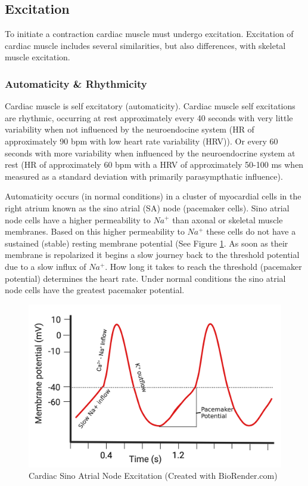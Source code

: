 \subsection{Excitation}

To initiate a contraction cardiac muscle must undergo excitation. Excitation of cardiac muscle includes several similarities, but also differences, with skeletal muscle excitation. 

\subsubsection{Automaticity \& Rhythmicity}

Cardiac muscle is self excitatory (automaticity). Cardiac muscle self excitations are rhythmic, occurring at rest approximately every 40 seconds with very little variability when not influenced by the neuroendocine system (HR of approximately 90 bpm with low heart rate variability (HRV)). Or every 60 seconds with more variability when influenced by the neuroendocrine system at rest (HR of approximately 60 bpm with a HRV of approximately 50-100 ms when measured as a standard deviation with primarily parasympthatic influence).

Automaticity occurs (in normal conditions) in a cluster of myocardial cells in the right atrium known as the sino atrial (SA) node (pacemaker cells). Sino atrial node cells have a higher permeability to $Na^+$ than axonal or skeletal muscle membranes. Based on this higher permeability to $Na^+$ these cells do not have a sustained (stable) resting membrane potential (See Figure \ref{fig:Cardiac_SA_Node_AP}. As soon as their membrane is repolarized it begins a slow journey back to the threshold potential due to a slow influx of $Na^+$. How long it takes to reach the threshold (pacemaker potential) determines the heart rate. Under normal conditions the sino atrial node cells have the greatest pacemaker potential.

\begin{figure}[!h]
    \centering
    \includegraphics[width=1\linewidth]{./figure/Cardiac_SA_Node_AP.png}
    \caption{Cardiac Sino Atrial Node Excitation \footnotesize{(Created with BioRender.com)}}
    \label{fig:Cardiac_SA_Node_AP}
\end{figure}

